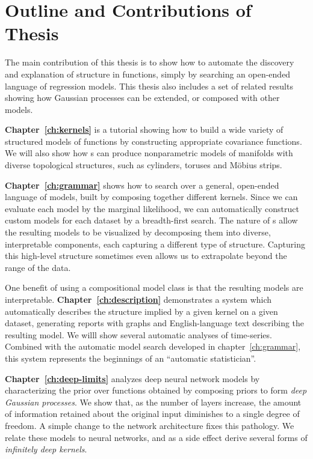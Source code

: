 \section{Outline and Contributions of Thesis}

The main contribution of this thesis is to show how to automate the discovery and explanation of structure in functions, simply by searching an open-ended language of regression models.
This thesis also includes a set of related results showing how Gaussian processes can be extended, or composed with other models.

{\bf Chapter~\ref{ch:kernels}} is a tutorial showing how to build a wide variety of structured models of functions by constructing appropriate covariance functions.
We will also show how \gp{}s can produce nonparametric models of manifolds with diverse topological structures, such as cylinders, toruses and M\"obius strips.

{\bf Chapter~\ref{ch:grammar}} shows how to search over a general, open-ended language of models, built by composing together different kernels.
Since we can evaluate each model by the marginal likelihood, we can automatically construct custom models for each dataset by a breadth-first search.
The nature of \gp{}s allow the resulting models to be visualized by decomposing them into diverse, interpretable components, each capturing a different type of structure.
Capturing this high-level structure sometimes even allows us to extrapolate beyond the range of the data.

One benefit of using a compositional model class is that the resulting models are interpretable.
{\bf Chapter~\ref{ch:description}} demonstrates a system which automatically describes the structure implied by a given kernel on a given dataset, generating reports with graphs and English-language text describing the resulting model.
We willl show several automatic analyses of time-series.
Combined with the automatic model search developed in chapter~\ref{ch:grammar}, this system represents the beginnings of an ``automatic statistician''.


{\bf Chapter~\ref{ch:deep-limits}} analyzes deep neural network models by characterizing the prior over functions obtained by composing \gp{} priors to form \emph{deep Gaussian processes}.
We show that, as the number of layers increase, the amount of information retained about the original input diminishes to a single degree of freedom.
A simple change to the network architecture fixes this pathology.
We relate these models to neural networks, and as a side effect derive several forms of \emph{infinitely deep kernels}.

